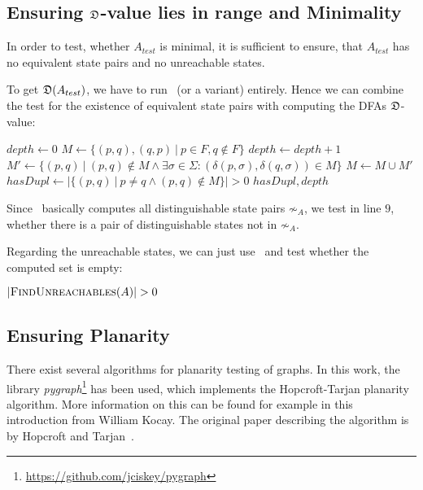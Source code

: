 \subsection{Ensuring $\mathfrak{D}$-value lies in range and Minimality}

In order to test, whether $A_{test}$ is minimal, it is sufficient to ensure, that $A_{test}$ has no equivalent state pairs and no unreachable states.

To get $\mathfrak{D}(A_{test})$, we have to run \CompDist\ (or a variant) entirely. Hence we can combine the test for the existence of equivalent state pairs with computing the DFAs $\mathfrak{D}$-value:
\vspace{0.2cm}
\begin{algorithmic}[1]
		\State $depth \gets 0$ 
		\State $M \gets \{ (p,q), (q,p)\ |\ p \in F, q \notin F \}$
		\Do
			\State $depth \gets depth + 1$
			\State $M' \gets \{ (p,q)\ |\ (p,q) \notin M \land \exists \sigma \in \Sigma \colon (\delta(p,\sigma), \delta(q,\sigma)) \in M \}$
			\State $M \gets M \cup M'$
		\State $hasDupl \gets | \{ (p,q)\ |\ p \neq q \land (p,q) \notin M \} | > 0$
		\State \Return $hasDupl, depth$
	\EndFunction
\end{algorithmic}
\vspace{0.2cm}
Since \CompDist\ basically computes all distinguishable state pairs $\not\sim_A$, we test in line $9$, whether there is a pair of distinguishable states not in $\not\sim_A$.

Regarding the unreachable states, we can just use \CompUnr\ and test whether the computed set is empty:
\vspace{0.2cm}
\begin{algorithmic}[1]
	\State \Return $|\textsc{FindUnreachables}(A)| > 0$
	\EndFunction
\end{algorithmic}

\subsection{Ensuring Planarity}\label{ch:3:sec:planarity}

There exist several algorithms for planarity testing of graphs. In this work, the library \emph{pygraph}\footnote{\url{https://github.com/jciskey/pygraph}} has been used, which implements the Hopcroft-Tarjan planarity algorithm. More information on this can be found for example in this~\cite{Koc93} introduction from William Kocay. The original paper describing the algorithm is by Hopcroft and Tarjan~\cite{HT74}.

